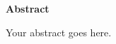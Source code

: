 
\begin{center}
{\large\bfseries Abstract}
\end{center}

\vspace{1em}


Your abstract goes here.

\vfill
